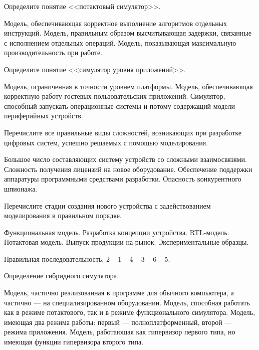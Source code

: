 \begin{questions}

\question[3] Определите понятие <<потактовый симулятор>>.
\begin{choices}
\choice Модель, обеспечивающая корректное выполнение алгоритмов отдельных инструкций.
\correctchoice Модель, правильным образом высчитывающая задержки, связанные с исполнением отдельных операций.
\choice Модель, показывающая максимальную производительность при работе.
\end{choices}

\question[3] Определите понятие <<симулятор уровня приложений>>.
\begin{choices}
\choice Модель, ограниченная в точности уровнем платформы.
\choice Модель, обеспечивающая корректную работу гостевых пользовательских приложений.
\correctchoice Симулятор, способный запускать операционные системы и потому содержащий модели периферийных устройств.
\end{choices}

\question[3] Перечислите все правильные виды сложностей, возникающих при разработке цифровых систем, успешно решаемых с помощью моделирования.
\begin{choices}
\correctchoice Большое число составляющих систему устройств со сложными взаимосвязями.
\choice Сложность получения лицензий на новое оборудование.
\correctchoice Обеспечение поддержки аппаратуры программными средствами разработки.
\choice Опасность конкурентного шпионажа.
\end{choices}

\question[3] Перечислите стадии создания нового устройства с задействованием моделирования в правильном порядке.
\begin{choices}
\choice Функциональная модель.
\choice Разработка концепции устройства.
\choice RTL-модель.
\choice Потактовая модель.
\choice Выпуск продукции на рынок.
\choice Экспериментальные образцы.
\end{choices}
\begin{solution}
    Правильная последовательность: 2 -- 1 -- 4 -- 3 -- 6 -- 5.
\end{solution}

\question[3] Определение гибридного симулятора.
\begin{choices}
\correctchoice Модель, частично реализованная в программе для обычного компьютера, а частично --- на специализированном оборудовании.
\choice Модель, способная работать как в режиме потактового, так и в режиме функционального симулятора.
\choice Модель, имеющая два режима работы: первый --- полноплатформенный, второй --- режима приложения.
\choice Модель, работающая как гипервизор первого типа, но имеющая функции гипервизора второго типа.
\end{choices}


\end{questions}

